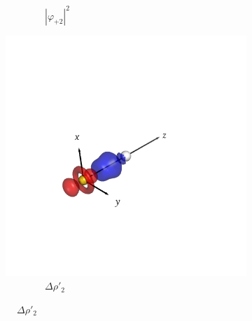 \documentclass[journal=inoraj,manuscript=article]{achemso}
\begin{document}
\begin{figure}[!h]
\begin{subfigure}[t]{0.32\textwidth}
        \caption*{\ \ \ \ \ \ \ \ $|\varphi_{+2}|^2$}
    \end{subfigure}
    \hfill
    \begin{subfigure}[t]{0.32\textwidth}
        \centering
        \includegraphics[width=\linewidth]{./AuFl+/pair3.png} 
        \caption*{\ \ \ \ \ \ \ \ $\Delta \rho'_2$} 
    \end{subfigure}


\end{figure}
\end{document}
